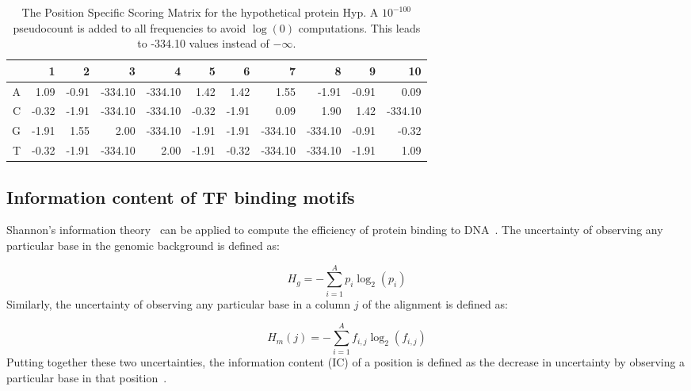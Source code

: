 \begin{table}
  \centering
  \caption[The Position Specific Scoring Matrix for the hypothetical
  protein.]{The Position Specific Scoring Matrix for the hypothetical protein
    Hyp. A $10^{-100}$ pseudocount is added to all frequencies to avoid
    $\log(0)$ computations. This leads to -334.10 values
    instead of $-\infty$.}
  \label{tab:pssm}
\setlength\tabcolsep{3.5pt} %
  \begin{tabular}{|r|r|r|r|r|r|r|r|r|r|r|}

\hline
  &     1 &   2 &    3 &    4 &    5 &    6 &    7 &    8 &    9 & 10\\
\hline
A &  1.09 & -0.91 & -334.10 & -334.10 &  1.42 &  1.42 &  1.55   & -1.91 & -0.91&   0.09\\
\hline
C & -0.32 & -1.91 & -334.10 & -334.10 & -0.32 & -1.91 &  0.09   & 1.90  & 1.42 & -334.10\\
\hline
G & -1.91 &  1.55 &  2.00   & -334.10 & -1.91 & -1.91 & -334.10 & -334.10 &  -0.91 & -0.32\\
\hline
T & -0.32 & -1.91 & -334.10 &  2.00   & -1.91 & -0.32 & -334.10 & -334.10 &  -1.91 &  1.09\\
\hline
  \end{tabular}
\end{table}

\subsection{Information content of TF binding motifs}

Shannon’s information theory~\citep{shannon1948mathematical} can be applied to
compute the efficiency of protein binding to DNA~\citep{schneider2010brief}.
The uncertainty of observing any particular base in the genomic background is
defined as:

\begin{equation}
  \label{eq:hg}
  H_g = -\displaystyle\sum_{i=1}^A p_i \log_2(p_i)
\end{equation}
Similarly, the uncertainty of observing any particular base in a column $j$ of
the alignment is defined as:

\begin{equation}
  \label{eq:hm}
  H_m(j) = -\displaystyle\sum_{i=1}^A f_{i, j} \log_2(f_{i, j})
\end{equation}
Putting together these two uncertainties, the information content (IC) of a
position is defined as the decrease in uncertainty by observing a particular
base in that position~\citep{schneider1986information}.

